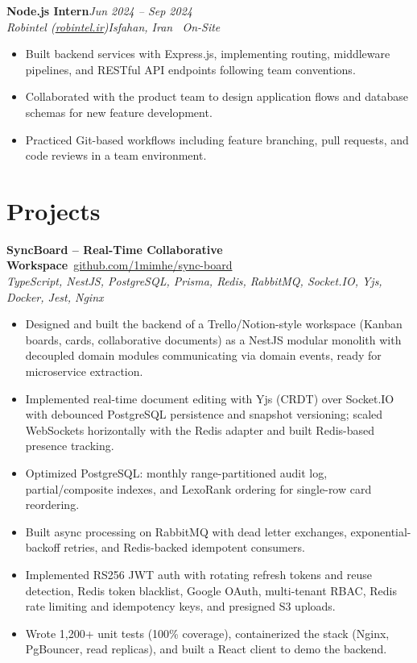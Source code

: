 \documentclass[a4paper,10pt]{article}
\newcommand{\experienceheader}[4]{%
  \noindent\textbf{#1}\hfill\textit{\small\color{medgray}#3}\\[-2pt]
  \textit{\color{medgray}#2}\hfill\textit{\small\color{medgray}#4}
  \vspace{2pt}
}
\newcommand{\projectheader}[4]{%
  \noindent\textbf{#1}\hfill{\small\faGithub\ \href{#2}{#3}}\\[-2pt]
  {\small\color{medgray}\textit{#4}}
  \vspace{2pt}
}
\begin{document}
\vspace{4pt}

\experienceheader
  {Node.js Intern}
  {Robintel (\href{https://robintel.ir/}{robintel.ir})}
  {Jun 2024 -- Sep 2024}
  {Isfahan, Iran \textbar\ On-Site}

\begin{itemize}
  \item Built backend services with Express.js, implementing routing, middleware pipelines, and RESTful API endpoints following team conventions.
  \item Collaborated with the product team to design application flows and database schemas for new feature development.
  \item Practiced Git-based workflows including feature branching, pull requests, and code reviews in a team environment.
\end{itemize}

\section{Projects}

\projectheader
  {SyncBoard -- Real-Time Collaborative Workspace}
  {https://github.com/1mimhe/sync-board}
  {github.com/1mimhe/sync-board}
  {TypeScript, NestJS, PostgreSQL, Prisma, Redis, RabbitMQ, Socket.IO, Yjs, Docker, Jest, Nginx}

\begin{itemize}
  \item Designed and built the backend of a Trello/Notion-style workspace (Kanban boards, cards, collaborative documents) as a NestJS modular monolith with decoupled domain modules communicating via domain events, ready for microservice extraction.
  \item Implemented real-time document editing with Yjs (CRDT) over Socket.IO with debounced PostgreSQL persistence and snapshot versioning; scaled WebSockets horizontally with the Redis adapter and built Redis-based presence tracking.
  \item Optimized PostgreSQL: monthly range-partitioned audit log, partial/composite indexes, and LexoRank ordering for single-row card reordering.
  \item Built async processing on RabbitMQ with dead letter exchanges, exponential-backoff retries, and Redis-backed idempotent consumers.
  \item Implemented RS256 JWT auth with rotating refresh tokens and reuse detection, Redis token blacklist, Google OAuth, multi-tenant RBAC, Redis rate limiting and idempotency keys, and presigned S3 uploads.
  \item Wrote 1,200+ unit tests (100\% coverage), containerized the stack (Nginx, PgBouncer, read replicas), and built a React client to demo the backend.
\end{itemize}
\end{document}
